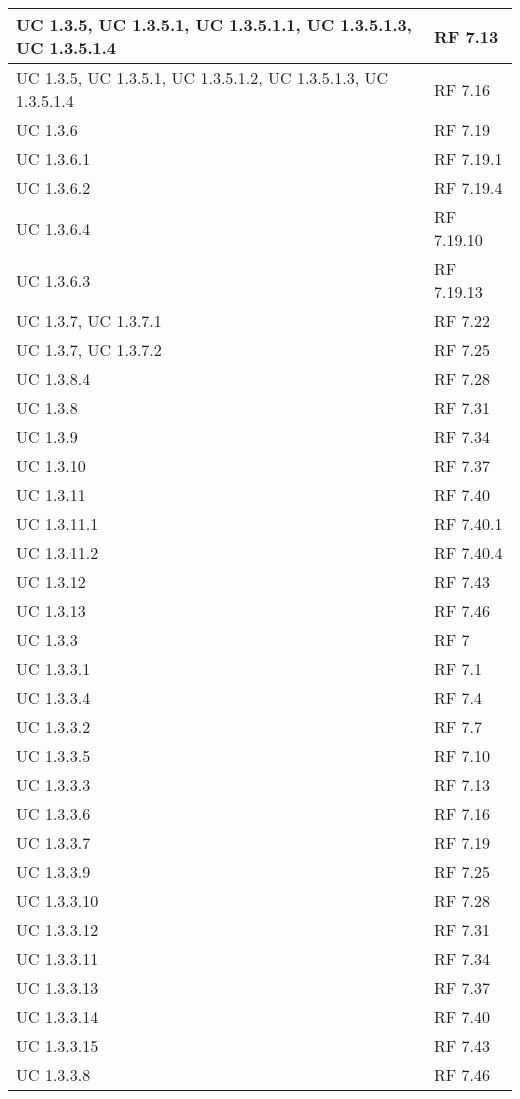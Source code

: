 {\begin{longtable} [c]{| p{4cm} | p{4cm} |}
 \hline 
UC 1.3.5, UC 1.3.5.1, UC 1.3.5.1.1, UC 1.3.5.1.3, UC 1.3.5.1.4 & RF 7.13\\ 
 \hline 
UC 1.3.5, UC 1.3.5.1, UC 1.3.5.1.2, UC 1.3.5.1.3, UC 1.3.5.1.4 & RF 7.16\\ 
 \hline 
UC 1.3.6 & RF 7.19\\ 
 \hline 
UC 1.3.6.1 & RF 7.19.1\\ 
 \hline 
UC 1.3.6.2 & RF 7.19.4\\ 
 \hline 
UC 1.3.6.4 & RF 7.19.10\\ 
 \hline 
UC 1.3.6.3 & RF 7.19.13\\ 
 \hline 
UC 1.3.7, UC 1.3.7.1 & RF 7.22\\ 
 \hline 
UC 1.3.7, UC 1.3.7.2 & RF 7.25\\ 
 \hline 
UC 1.3.8.4 & RF 7.28\\ 
 \hline 
UC 1.3.8 & RF 7.31\\ 
 \hline 
UC 1.3.9 & RF 7.34\\ 
 \hline 
UC 1.3.10 & RF 7.37\\ 
 \hline 
UC 1.3.11 & RF 7.40\\ 
 \hline 
UC 1.3.11.1 & RF 7.40.1\\ 
 \hline 
UC 1.3.11.2 & RF 7.40.4\\ 
 \hline 
UC 1.3.12 & RF 7.43\\ 
 \hline 
UC 1.3.13 & RF 7.46\\ 
 \hline 
UC 1.3.3 & RF 7\\ 
 \hline 
UC 1.3.3.1 & RF 7.1\\ 
 \hline 
UC 1.3.3.4 & RF 7.4\\ 
 \hline 
UC 1.3.3.2 & RF 7.7\\ 
 \hline 
UC 1.3.3.5 & RF 7.10\\ 
 \hline 
UC 1.3.3.3 & RF 7.13\\ 
 \hline 
UC 1.3.3.6 & RF 7.16\\ 
 \hline 
UC 1.3.3.7 & RF 7.19\\ 
 \hline 
UC 1.3.3.9 & RF 7.25\\ 
 \hline 
UC 1.3.3.10 & RF 7.28\\ 
 \hline 
UC 1.3.3.12 & RF 7.31\\ 
 \hline 
UC 1.3.3.11 & RF 7.34\\ 
 \hline 
UC 1.3.3.13 & RF 7.37\\ 
 \hline 
UC 1.3.3.14 & RF 7.40\\ 
 \hline 
UC 1.3.3.15 & RF 7.43\\ 
 \hline 
UC 1.3.3.8 & RF 7.46\\ 

\end{longtable}}
